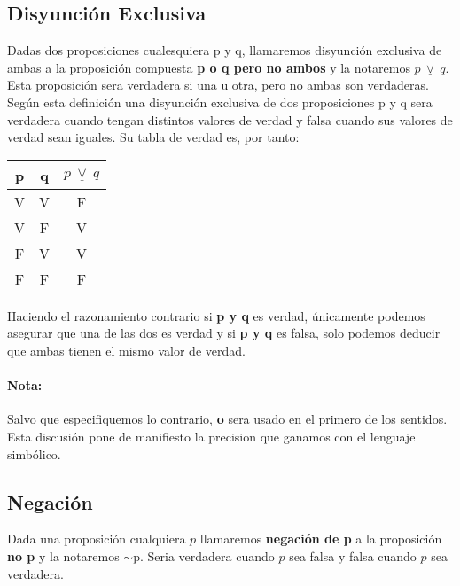 \documentclass[a4paper,11pt,oneside,titlepage,final]{scrartc}
\begin{document}
\subsection{Disyunción Exclusiva}

Dadas dos proposiciones cualesquiera p y q, llamaremos disyunción exclusiva de ambas a la proposición compuesta \textbf{p o q pero no ambos} y la notaremos $p~\underline{\vee}~q$. Esta proposición sera verdadera si una u otra, pero no ambas son verdaderas.\\

Según esta definición una disyunción exclusiva de dos proposiciones p y q sera verdadera cuando tengan distintos valores de verdad y falsa cuando sus valores de verdad sean iguales. Su tabla de verdad es, por tanto:\\

\begin{center}
\begin{tabular}{|c|c|c|}
\hline 
p & q & $p~\underline{\vee}~q$ \\ 
\hline 
V & V & F \\ 
\hline 
V & F & V \\ 
\hline 
F & V & V \\ 
\hline 
F & F & F \\ 
\hline 
\end{tabular}
\end{center}

Haciendo el razonamiento contrario si \textbf{p y q} es verdad, únicamente podemos asegurar que una de las dos es verdad y si \textbf{p y q} es falsa, solo podemos deducir que ambas tienen el mismo valor de verdad.\\

\paragraph{Nota:} Salvo que especifiquemos lo contrario, \textbf{o} sera usado en el primero de los sentidos. Esta discusión pone de manifiesto la precision que ganamos con el lenguaje simbólico.

\subsection{Negación}

Dada una proposición cualquiera $p$ llamaremos \textbf{negación de p} a la proposición \textbf{no p} y la notaremos $\sim$p. Seria verdadera cuando $p$ sea falsa y falsa cuando $p$ sea verdadera.\\
\end{document}

